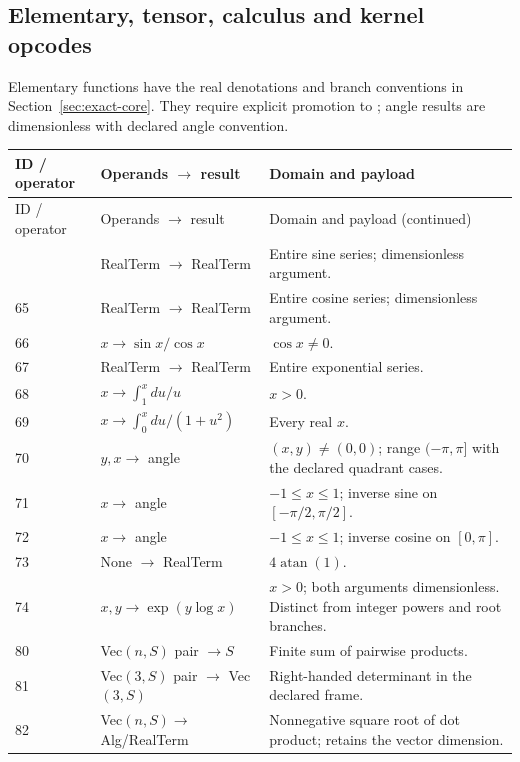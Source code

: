 \subsection{Elementary, tensor, calculus and kernel opcodes}
Elementary functions have the real denotations and branch conventions in
Section~\ref{sec:exact-core}. They require explicit promotion to
; angle results are dimensionless with declared angle convention.

{\footnotesize
\begin{longtable}{@{}P{.23\linewidth}P{.24\linewidth}P{.48\linewidth}@{}}
\toprule ID / operator & Operands $\to$ result & Domain and payload\\\midrule\endfirsthead
\toprule ID / operator & Operands $\to$ result & Domain and payload (continued)\\\midrule\endhead
\bottomrule{}  & RealTerm $\to$ RealTerm & Entire sine series; dimensionless argument.\\
65  & RealTerm $\to$ RealTerm & Entire cosine series; dimensionless argument.\\
66  & $x\to\sin x/\cos x$ & $\cos x\ne0$.\\
67  & RealTerm $\to$ RealTerm & Entire exponential series.\\
68  & $x\to\int_1^x du/u$ & $x>0$.\\
69  & $x\to\int_0^x du/(1+u^2)$ & Every real $x$.\\
70  & $y,x\to$ angle & $(x,y)\ne(0,0)$; range $(-\pi,\pi]$ with the declared quadrant cases.\\
71  & $x\to$ angle & $-1\le x\le1$; inverse sine on $[-\pi/2,\pi/2]$.\\
72  & $x\to$ angle & $-1\le x\le1$; inverse cosine on $[0,\pi]$.\\
73  & None $\to$ RealTerm & $4\operatorname{atan}(1)$.\\
74  & $x,y\to\exp(y\log x)$ & $x>0$; both arguments dimensionless. Distinct from integer powers and root branches.\\
80  & Vec$(n,S)$ pair $\to S$ & Finite sum of pairwise products.\\
81  & Vec$(3,S)$ pair $\to$ Vec$(3,S)$ & Right-handed determinant in the declared frame.\\
82  & Vec$(n,S)\to$ Alg/RealTerm & Nonnegative square root of dot product; retains the vector dimension.\\

\end{longtable}}
